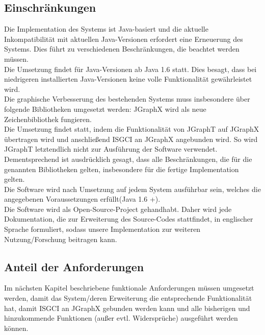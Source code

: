 \documentclass[11pt,a4paper]{article}
\begin{document}
	\subsection{Einschränkungen} %
	Die Implementation des Systems ist Java-basiert und die aktuelle Inkompatibilität mit aktuellen Java-Versionen erfordert eine Erneuerung des Systems. Dies führt zu verschiedenen Beschränkungen, die beachtet werden müssen.\\
	Die Umsetzung findet für Java-Versionen ab Java 1.6 statt. Dies besagt, dass bei niedrigeren installierten Java-Versionen keine volle Funktionalität gewährleistet wird.\\
	Die graphische Verbesserung des bestehenden Systems muss insbesondere über folgende Bibliotheken umgesetzt werden:
	JGraphX wird als neue Zeichenbibliothek fungieren.\\
	Die Umsetzung findet statt, indem die Funktionalität von JGraphT auf JGraphX übertragen wird und anschließend ISGCI an JGraphX angebunden wird. So wird JGraphT letztendlich nicht zur Ausführung der Software verwendet.\\
	Dementsprechend ist ausdrücklich gesagt, dass alle Beschränkungen, die für die genannten Bibliotheken gelten, insbesondere für die fertige Implementation gelten.\\
	Die Software wird nach Umsetzung auf jedem System ausführbar sein, welches die angegebenen Voraussetzungen erfüllt(Java 1.6 +).\\
	Die Software wird als Open-Source-Project gehandhabt. Daher wird jede Dokumentation, die zur Erweiterung des Source-Codes stattfindet, in englischer Sprache formuliert, sodass unsere Implementation zur weiteren Nutzung/Forschung beitragen kann. 
	\subsection{Anteil der Anforderungen} %
	Im nächsten Kapitel beschriebene funktionale Anforderungen müssen umgesetzt werden, damit das System/deren Erweiterung die entsprechende Funktionalität hat, damit ISGCI an JGraphX gebunden werden kann und alle bisherigen und hinzukommende Funktionen (außer evtl. Widersprüche) ausgeführt werden können.
\newpage
\end{document}
